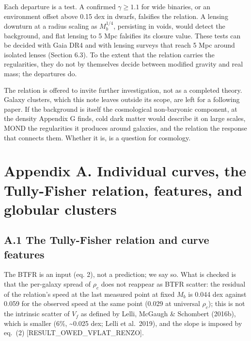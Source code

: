 \documentclass[
  10pt,
]{article}
\begin{document}
Each departure is a test. A confirmed $\gamma\ge1.1$ for wide binaries, or an environment offset above 0.15 dex in dwarfs, falsifies the relation. A lensing downturn at a radius scaling as $M_b^{1/4}$, persisting in voids, would detect the background, and flat lensing to 5 Mpc falsifies its closure value. These tests can be decided with Gaia DR4 and with lensing surveys that reach 5 Mpc around isolated lenses (Section 6.3). To the extent that the relation carries the regularities, they do not by themselves decide between modified gravity and real mass; the departures do.

The relation is offered to invite further investigation, not as a completed theory. Galaxy clusters, which this note leaves outside its scope, are left for a following paper. If the background is itself the cosmological non-baryonic component, at the density Appendix G finds, cold dark matter would describe it on large scales, MOND the regularities it produces around galaxies, and the relation the response that connects them. Whether it is, is a question for cosmology.

\section{Appendix A. Individual curves, the Tully-Fisher relation, features, and globular clusters}\label{appendix-a.-individual-curves-the-tully-fisher-relation-features-and-globular-clusters}

\subsection{A.1 The Tully-Fisher relation and curve features}\label{the-tully-fisher-relation-and-curve-features}

The BTFR is an input (eq. 2), not a prediction; we say so. What is checked is that the per-galaxy spread of $\rho_c$ does not reappear as BTFR scatter: the residual of the relation's speed at the last measured point at fixed $M_b$ is 0.044 dex against 0.059 for the observed speed at the same point (0.029 at universal $\rho_c$); this is not the intrinsic scatter of $V_f$ as defined by Lelli, McGaugh \& Schombert (2016b), which is smaller (6\%, \textasciitilde{}0.025 dex; Lelli et al.~2019), and the slope is imposed by eq.~(2) {[}RESULT\_OWED\_VFLAT\_RENZO{]}.
\end{document}
